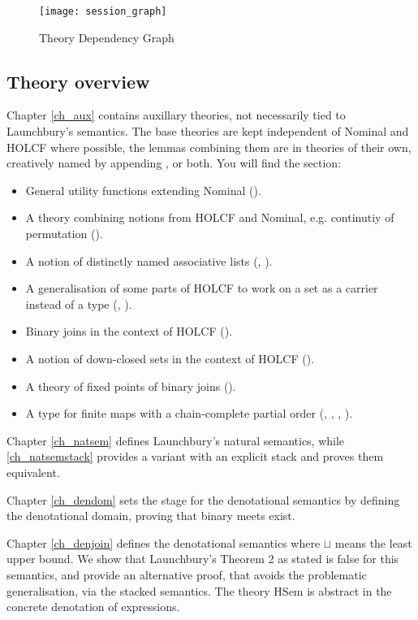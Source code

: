 \documentclass[11pt,a4paper,parskip=half]{scrartcl}
\begin{document}
\begin{figure}
\begin{center}
  \texttt{[image: session\_graph]}
\end{center}
\caption{Theory Dependency Graph\label{theory-deps}}
\end{figure}

\subsection{Theory overview}

Chapter \ref{ch_aux} contains auxillary theories, not necessarily tied to Launchbury's semantics. The base theories are kept independent of Nominal and HOLCF where possible, the lemmas combining them are in theories of their own, creatively named by appending ,  or both.  You will find the section:
\begin{itemize}
\item General utility functions extending Nominal ().
\item A theory combining notions from HOLCF and Nominal, e.g. continutiy of permutation ().
\item A notion of distinctly named associative lists (, ). 
\item A generalisation of some parts of HOLCF to work on a set as a carrier instead of a type (, ).
\item Binary joins in the context of HOLCF ().
\item A notion of down-closed sets in the context of HOLCF ().
\item A theory of fixed points of binary joins ().
\item A type for finite maps with a chain-complete partial order (, , , ).
\end{itemize}

Chapter \ref{ch_natsem} defines Launchbury's natural semantics, while \ref{ch_natsemstack} provides a variant with an explicit stack and proves them equivalent.

Chapter \ref{ch_dendom} sets the stage for the denotational semantics by defining the denotational domain, proving that binary meets exist.

Chapter \ref{ch_denjoin} defines the denotational semantics where $\sqcup$ means the least upper bound. We show that Launchbury's Theorem 2 as stated is false for this semantics, and provide an alternative proof, that avoids the problematic generalisation, via the stacked semantics. The theory HSem is abstract in the concrete denotation of expressions.
\end{document}

